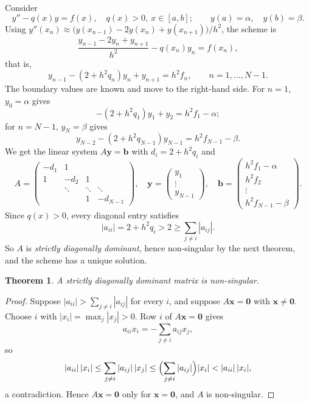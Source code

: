 \documentclass[11pt,a4paper]{article}
\numberwithin{equation}{section}
\theoremstyle{spacedplain}
\newtheorem{theorem}{Theorem}[section]
\theoremstyle{spaceddefinition}
\theoremstyle{spacedremark}
\begin{document}
Consider
\[
  y''-q(x)y=f(x),\quad q(x)>0,\ x\in[a,b];
  \qquad y(a)=\alpha,\quad y(b)=\beta.
\]
Using
\(y''(x_n)\approx\bigl(y(x_{n-1})-2y(x_n)+y(x_{n+1})\bigr)/h^2\), the
scheme is
\[
  \frac{y_{n-1}-2y_n+y_{n+1}}{h^2}-q(x_n)y_n=f(x_n),
\]
that is,
\[
  y_{n-1}-(2+h^2q_n)y_n+y_{n+1}=h^2f_n,
  \qquad n=1,\dots,N-1.
\]
The boundary values are known and move to the right-hand side.  For
\(n=1\), \(y_0=\alpha\) gives
\[
  -(2+h^2q_1)y_1+y_2=h^2f_1-\alpha ;
\]
for \(n=N-1\), \(y_N=\beta\) gives
\[
  y_{N-2}-(2+h^2q_{N-1})y_{N-1}=h^2f_{N-1}-\beta .
\]
We get the linear system \(A\mathbf y=\mathbf b\) with
\(d_i=2+h^2q_i\) and
\[
  A=\begin{pmatrix}-d_1&1&&\\ 1&-d_2&1&\\ &\ddots&\ddots&\ddots\\ &&1&-d_{N-1}\end{pmatrix},
  \quad
  \mathbf y=\begin{pmatrix}y_1\\ \vdots\\ y_{N-1}\end{pmatrix},
  \quad
  \mathbf b=\begin{pmatrix}h^2f_1-\alpha\\ h^2f_2\\ \vdots\\ h^2f_{N-1}-\beta\end{pmatrix}.
\]
Since \(q(x)>0\), every diagonal entry satisfies
\[
  |a_{ii}|=2+h^2q_i>2\ge\sum_{j\ne i}|a_{ij}|.
\]
So \(A\) is \emph{strictly diagonally dominant}, hence non-singular by
the next theorem, and the scheme has a unique solution.

\begin{keybox}
\begin{theorem}\label{thm:dd}
A strictly diagonally dominant matrix is non-singular.
\end{theorem}
\end{keybox}

\begin{proof}
Suppose \(|a_{ii}|>\sum_{j\ne i}|a_{ij}|\) for every \(i\), and suppose
\(A\mathbf x=\mathbf 0\) with \(\mathbf x\ne\mathbf 0\).  Choose \(i\)
with \(|x_i|=\max_j|x_j|>0\).  Row \(i\) of \(A\mathbf x=\mathbf 0\)
gives
\[
  a_{ii}x_i=-\sum_{j\ne i}a_{ij}x_j,
\]
so
\[
  |a_{ii}|\,|x_i|
  \le\sum_{j\ne i}|a_{ij}|\,|x_j|
  \le\Bigl(\sum_{j\ne i}|a_{ij}|\Bigr)|x_i|
  <|a_{ii}|\,|x_i|,
\]
a contradiction.  Hence \(A\mathbf x=\mathbf 0\) only for
\(\mathbf x=\mathbf 0\), and \(A\) is non-singular.
\end{proof}
\end{document}
